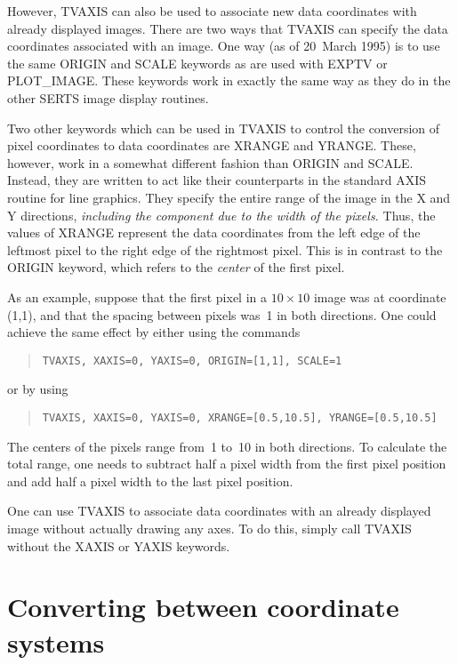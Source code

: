 However, TVAXIS can also be used to associate new data coordinates with already
displayed images.  There are two ways that TVAXIS can specify the data
coordinates associated with an image.  One way (as of 20~March 1995) is to use
the same ORIGIN and SCALE keywords as are used with EXPTV or PLOT\_IMAGE.
These keywords work in exactly the same way as they do in the other SERTS image
display routines.

Two other keywords which can be used in TVAXIS to control the conversion of
pixel coordinates to data coordinates are XRANGE and YRANGE.  These, however,
work in a somewhat different fashion than ORIGIN and SCALE.  Instead, they are
written to act like their counterparts in the standard AXIS routine for line
graphics.  They specify the entire range of the image in the X and Y
directions, {\em including the component due to the width of the pixels.}
Thus, the values of XRANGE represent the data coordinates from the left edge of
the leftmost pixel to the right edge of the rightmost pixel.  This is in
contrast to the ORIGIN keyword, which refers to the {\em center} of the first
pixel.

As an example, suppose that the first pixel in a \mbox{$10 \times 10$} image
was at coordinate \mbox{(1,1)}, and that the spacing between pixels was~1 in
both directions.  One could achieve the same effect by either using the
commands
\begin{quote}
\begin{verbatim}
TVAXIS, XAXIS=0, YAXIS=0, ORIGIN=[1,1], SCALE=1
\end{verbatim}
\end{quote}
or by using
\begin{quote}
\begin{verbatim}
TVAXIS, XAXIS=0, YAXIS=0, XRANGE=[0.5,10.5], YRANGE=[0.5,10.5]
\end{verbatim}
\end{quote}
The centers of the pixels range from~1 to~10 in both directions.  To calculate
the total range, one needs to subtract half a pixel width from the first pixel
position and add half a pixel width to the last pixel position.

One can use TVAXIS to associate data coordinates with an already displayed
image without actually drawing any axes.  To do this, simply call TVAXIS
without the XAXIS or YAXIS keywords.

\section{Converting between coordinate systems}

